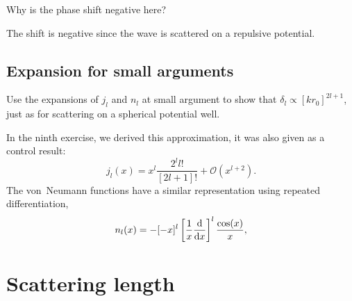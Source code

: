 \documentclass[11pt, english, fleqn, DIV=15, headinclude, BCOR=1.5cm]{scrartcl}
\begin{document}
\begin{problem}
    Why is the phase shift negative here?
\end{problem}

The shift is negative since the wave is scattered on a repulsive potential.

\subsection{Expansion for small arguments}

\begin{problem}
    Use the expansions of $j_l$ and $n_l$ at small argument to show that
    $\delta_l \propto [kr_0]^{2l+1}$, just as for scattering on a spherical
    potential well.
\end{problem}

In the ninth exercise, we derived this approximation, it was also given as a
control result:
\[
    j_l(x) = x^l \frac{2^l l!}{[2l+1]!} + \mathcal O(x^{l+2}).
\]
The von~Neumann functions have a similar representation using repeated
differentiation,
\[
    n_l(x) = - [-x]^l \left[ \frac 1x \frac{\mathop{}\!\mathrm d {}}{\mathop{}\!\mathrm d {x}} \right]^l \frac{\cos(x)}{x},
\]
\parencite{wikipedia/bessel_dgl}

\section{Scattering length}
\end{document}
